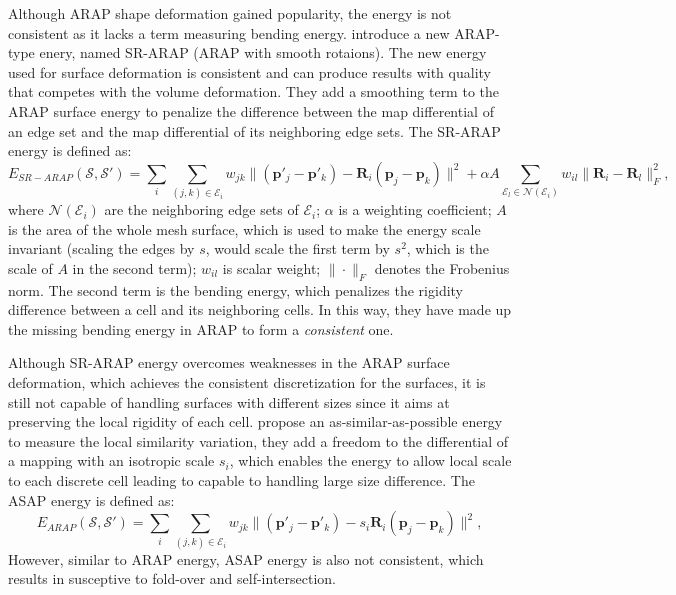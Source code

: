 Although ARAP shape deformation gained popularity, the energy is not consistent as it lacks a term measuring bending energy. \cite{levi2015smooth} introduce a new ARAP-type enery, named SR-ARAP (ARAP with smooth rotaions). The new energy used for surface deformation is consistent and can produce results with quality that competes with the volume deformation. They add a smoothing term to the ARAP surface energy to penalize the difference between the map differential of an edge set and the map differential of its neighboring edge sets. The SR-ARAP energy is defined as:
\begin{equation}\label{esrarap}
E_{\!S\!R\!-\!A\!R\!A\!P\!}(\mathcal S, \mathcal S')=\displaystyle \sum_i\!\!\sum_{(j,k)\in\mathcal{E}_i}\!\!\!w_{jk}\|(\mathbf p'_j - \mathbf p'_k)\!-\!\mathbf R_i(\mathbf p_j - \mathbf p_k)\|^2 + \alpha A\!\!\!\!\sum_{\mathcal{E}_l \in \mathcal{N}(\mathcal{E}_i)}\!\!\!\!\!\!w_{il}\|\mathbf R_i-\mathbf R_l\|_F^2 ,
\end{equation}
where $\mathcal{N}(\mathcal{E}_i)$ are the neighboring edge sets of $\mathcal{E}_i$;  $\alpha$ is a weighting coefficient; $A$ is the area of the whole mesh surface, which is used to make the energy scale invariant (scaling the edges by $s$, would scale the first term by $s^2$, which is the scale of $A$ in the second term); $w_{il}$ is scalar weight; $\|\cdot\|_F$ denotes the Frobenius norm. The second term is the bending energy, which penalizes the rigidity difference between a cell and its neighboring cells. In this way, they have made up the missing bending energy in ARAP to form a \emph{consistent} one.

Although SR-ARAP energy overcomes weaknesses in the ARAP surface deformation, which achieves the consistent discretization for the surfaces, it is still not capable of handling surfaces with different sizes since it aims at preserving the local rigidity of each cell. \cite{yamazaki2013non} propose an as-similar-as-possible energy to measure the local similarity variation, they add a freedom to the differential of a mapping with an isotropic scale $s_i$, which enables the energy to allow local scale to each discrete cell leading to capable to handling large size difference. The ASAP energy is defined as:
\begin{equation}\label{easap}
E_{ARAP}(\mathcal S, \mathcal S')=\displaystyle \sum_i\!\!\sum_{(j,k)\in\mathcal{E}_i}\!\!\!w_{jk}\|(\mathbf p'_j - \mathbf p'_k)\!-\!s_i\mathbf R_i(\mathbf p_j - \mathbf p_k)\|^2,
\end{equation}
 However, similar to ARAP energy, ASAP energy is also not consistent, which results in susceptive to fold-over and self-intersection.

